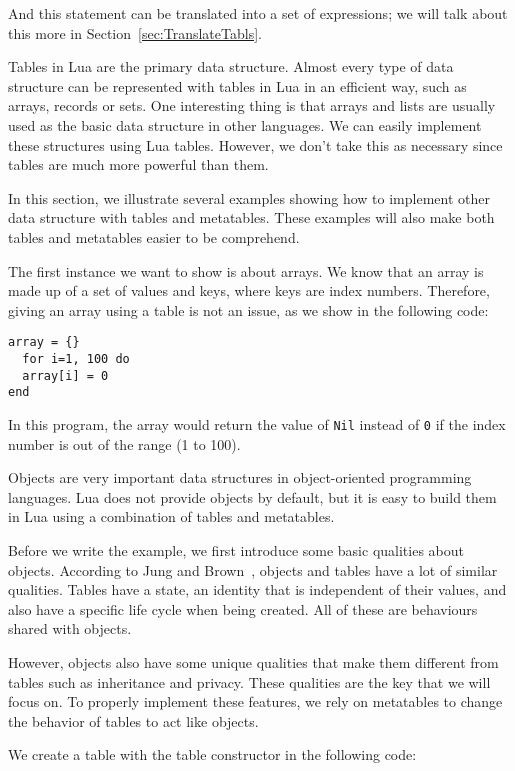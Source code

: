 And this statement can be translated into a set of expressions; we will talk about this more in Section~\ref{sec:TranslateTabls}.

Tables in Lua are the primary data structure. Almost every type of data structure can be represented with tables in Lua in an efficient way, such as arrays, records or sets. One interesting thing is that arrays and lists are usually used as the basic data structure in other languages. We can easily implement these structures using Lua tables. However, we don't take this as necessary since tables are much more powerful than them.

In this section, we illustrate several examples showing how to implement other data structure with tables and metatables. These examples will also make both tables and metatables easier to be comprehend.

The first instance we want to show is about arrays. We know that an array is made up of a set of values and keys, where keys are index numbers. Therefore, giving an array using a table is not an issue, as we show in the following code:

\begin{verbatim}
array = {}
  for i=1, 100 do
  array[i] = 0
end
\end{verbatim}

In this program, the array would return the value of {\tt Nil} instead of {\tt 0} if the index number is out of the range (1 to 100).

Objects are very important data structures in object-oriented programming languages. Lua does not provide objects by default, but it is easy to build them in Lua using a combination of tables and metatables.

Before we write the example, we first introduce some basic qualities about objects. According to Jung and Brown~\cite{begLua}, objects and tables have a lot of similar qualities. Tables have a state, an identity that is independent of their values, and also have a specific life cycle when being created. All of these are behaviours shared with objects.

However, objects also have some unique qualities that make them different from tables such as inheritance and privacy. These qualities are the key that we will focus on.
To properly implement these features, we rely on metatables to change the behavior of tables to act like objects.

We create a table with the table constructor in the following code:

